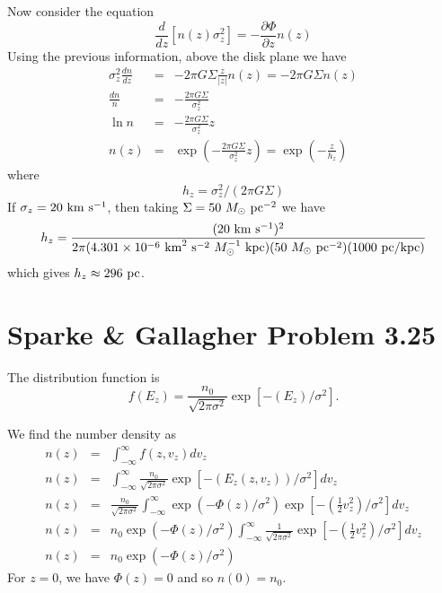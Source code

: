 \documentclass[]{article}
\begin{document}
\noindent
Now consider the equation
\begin{equation}
\frac{d}{dz}[n(z)\sigma_z^2] = - \frac{\partial \Phi}{\partial z} n(z)
\end{equation}
\noindent
Using the previous information, above the disk plane we have
\begin{eqnarray}
\sigma_z^2 \frac{dn}{dz} &=& -2\pi G \Sigma \frac{z}{|z|} n(z) = -2\pi G \Sigma n(z)\\
\frac{dn}{n} &=& -\frac{2\pi G\Sigma}{\sigma_z^2}\\
\ln n &=& -\frac{2\pi G\Sigma}{\sigma_z^2} z\\
n(z) &=& \exp\left(-\frac{2\pi G\Sigma}{\sigma_z^2} z \right) = \exp\left(- \frac{z}{h_z}\right)
\end{eqnarray}
\noindent
where
\begin{equation}
h_z = \sigma_z^2 / (2\pi G \Sigma)
\end{equation}
\noindent
If $\sigma_z = 20~\mathrm{km}~\mathrm{s}^{-1}$, then taking $\Sigma = 50~M_{\odot}~\mathrm{pc}^{-2}$ we have
\begin{equation}
h_z = \frac{(20~\mathrm{km}~\mathrm{s}^{-1})^2}{2\pi(4.301\times10^{-6}~\mathrm{km}^2~\mathrm{s}^{-2}~M_{\odot}^{-1}~\mathrm{kpc})(50~M_{\odot}~\mathrm{pc}^{-2})(1000~\mathrm{pc}/\mathrm{kpc})}
\end{equation}
\noindent
which gives $h_z \approx 296~\mathrm{pc}$.


\section{Sparke \& Gallagher Problem 3.25}
The distribution function is
\begin{equation}
f(E_z) = \frac{n_0}{\sqrt{2\pi\sigma^2}}\exp\left[-\left(E_z\right)/\sigma^2\right].
\end{equation}
\noindent

We find the number density as
\begin{eqnarray}
n(z) &=& \int_{-\infty}^{\infty} f(z,v_z) dv_z\\
n(z) &=& \int_{-\infty}^{\infty} \frac{n_0}{\sqrt{2\pi\sigma^2}}\exp\left[-\left(E_z(z,v_z)\right)/\sigma^2\right] dv_z\\
n(z)&=&\frac{n_0}{\sqrt{2\pi\sigma^2}}\int_{-\infty}^{\infty}  \exp(-\Phi(z)/\sigma^2)\exp\left[-\left(\frac{1}{2}v_z^2\right)/\sigma^2\right]dv_z\\
n(z)&=&n_0\exp(-\Phi(z)/\sigma^2)\int_{-\infty}^{\infty} \frac{1}{\sqrt{2\pi\sigma^2}} \exp\left[-\left(\frac{1}{2}v_z^2\right)/\sigma^2\right]dv_z\\
n(z)&=&n_0\exp(-\Phi(z)/\sigma^2)
\end{eqnarray}
For $z=0$, we have $\Phi(z) = 0$ and
so $n(0) = n_0$.
\end{document}
